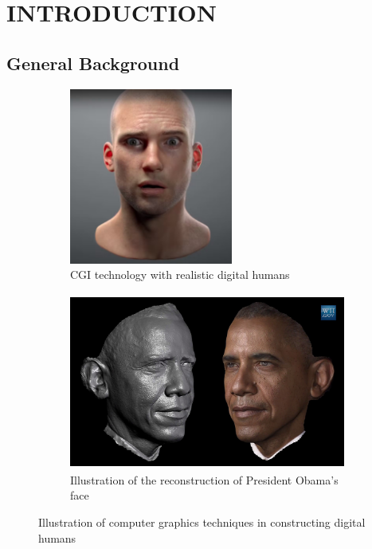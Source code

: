 	
	


\chapter{INTRODUCTION}
\label{Introduction}

\section{General Background}

\begin{figure}[htbp]
	\centering
	\begin{subfigure}{0.35\textwidth}
		\centering
		\includegraphics[height=5.8cm]{images/cgi}
		\caption{\small CGI technology with realistic digital humans \cite{edchrisjones}}
		\label{fig:CGI}
	\end{subfigure}
	\hfill
	\begin{subfigure}{0.6\textwidth}
		\centering
		\includegraphics[height=5.8cm]{images/obama_scan}
		\caption{\small Illustration of the reconstruction of President Obama's face \cite{metallo2015scanning}}
		\label{fig:obamascan}
	\end{subfigure}
	\caption{Illustration of computer graphics techniques in constructing digital humans}
	\label{fig:DigitalHuman}
\end{figure}

